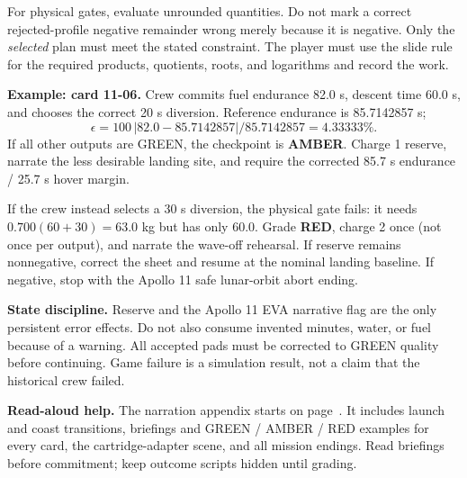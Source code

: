 \documentclass[11pt]{article}
\begin{document}
For physical gates, evaluate unrounded quantities. Do not mark a
correct rejected-profile negative remainder wrong merely because
it is negative. Only the \emph{selected} plan must meet the stated
constraint. The player must use the slide rule for the required
products, quotients, roots, and logarithms and record the work.

\textbf{Example: card 11-06.}
Crew commits fuel endurance 82.0 s, descent time 60.0 s, and chooses
the correct 20 s diversion. Reference endurance is 85.7142857 s;
\[
\epsilon=100\,|82.0-85.7142857|/85.7142857=4.33333\%.
\]
If all other outputs are GREEN, the checkpoint is \textbf{AMBER}.
Charge 1 reserve, narrate the less desirable landing site, and require
the corrected 85.7 s endurance / 25.7 s hover margin.

If the crew instead selects a 30 s diversion, the physical gate fails:
it needs \(0.700(60+30)=63.0\) kg but has only 60.0.
Grade \textbf{RED}, charge 2 once (not once per output), and narrate
the wave-off rehearsal. If reserve remains nonnegative, correct the
sheet and resume at the nominal landing baseline. If negative, stop
with the Apollo 11 safe lunar-orbit abort ending.

\textbf{State discipline.} Reserve and the Apollo 11 EVA narrative flag
are the only persistent error effects. Do not also consume invented
minutes, water, or fuel because of a warning.
All accepted pads must be corrected to GREEN quality before continuing.
Game failure is a simulation result, not a claim that the historical
crew failed.

\textbf{Read-aloud help.} The narration appendix starts on
page~\pageref{narration-start}. It includes launch and coast transitions,
briefings and GREEN / AMBER / RED examples for every card,
the cartridge-adapter scene, and all mission endings.
Read briefings before commitment; keep outcome scripts hidden until grading.


\clearpage

\clearpage

\end{document}

